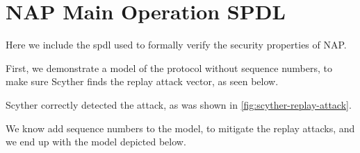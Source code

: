 \chapter{NAP Main Operation SPDL}\label{chp:nuts-spdl}

Here we include the \gls{spdl} used to formally verify the security properties of NAP.

First, we demonstrate a model of the protocol without sequence numbers, to make sure Scyther finds the replay attack vector, as seen below.



Scyther correctly detected the attack, as was shown in \autoref{fig:scyther-replay-attack}.

We know add sequence numbers to the model, to mitigate the replay attacks, and we end up with the model depicted below.


